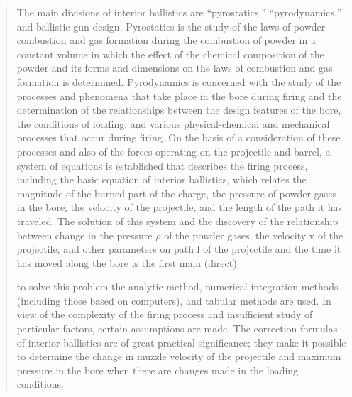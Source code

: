 \begin{quotation}
The main divisions of interior ballistics are “pyrostatics,”
“pyrodynamics,” and ballistic gun design. Pyrostatics is the study of
the laws of powder combustion and gas formation during the combustion
of powder in a constant volume in which the effect of the chemical
composition of the powder and its forms and dimensions on the laws of
combustion and gas formation is determined. Pyrodynamics is concerned
with the study of the processes and phenomena that take place in the
bore during firing and the determination of the relationships between
the design features of the bore, the conditions of loading, and
various physical-chemical and mechanical processes that occur during
firing. On the basis of a consideration of these processes and also of
the forces operating on the projectile and barrel, a system of
equations is established that describes the firing process, including
the basic equation of interior ballistics, which relates the magnitude
of the burned part of the charge, the pressure of powder gases in the
bore, the velocity of the projectile, and the length of the path it
has traveled. The solution of this system and the discovery of the
relationship between change in the pressure $\rho$ of the powder
gases, the velocity v of the projectile, and other parameters on path
l of the projectile and the time it has moved along the bore is the
first main (direct)

to solve this problem the analytic method, numerical integration
methods (including those based on computers), and tabular methods are
used. In view of the complexity of the firing process and insufficient
study of particular factors, certain assumptions are made. The
correction formulas of interior ballistics are of great practical
significance; they make it possible to determine the change in muzzle
velocity of the projectile and maximum pressure in the bore when there
are changes made in the loading conditions.


\end{quotation}
